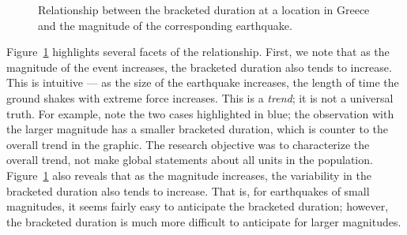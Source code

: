 \documentclass[
  letterpaper,
  DIV=11,
  numbers=noendperiod]{scrreprt}
\theoremstyle{definition}
\theoremstyle{definition}
\theoremstyle{plain}
\theoremstyle{remark}
\begin{document}
\begin{figure}


\caption{\label{fig-regsummaries-magnitude}Relationship between the
bracketed duration at a location in Greece and the magnitude of the
corresponding earthquake.}

\end{figure}%

Figure~\ref{fig-regsummaries-magnitude} highlights several facets of the
relationship. First, we note that as the magnitude of the event
increases, the bracketed duration also tends to increase. This is
intuitive --- as the size of the earthquake increases, the length of
time the ground shakes with extreme force increases. This is a
\emph{trend}; it is not a universal truth. For example, note the two
cases highlighted in blue; the observation with the larger magnitude has
a smaller bracketed duration, which is counter to the overall trend in
the graphic. The research objective was to characterize the overall
trend, not make global statements about all units in the population.
Figure~\ref{fig-regsummaries-magnitude} also reveals that as the
magnitude increases, the variability in the bracketed duration also
tends to increase. That is, for earthquakes of small magnitudes, it
seems fairly easy to anticipate the bracketed duration; however, the
bracketed duration is much more difficult to anticipate for larger
magnitudes.
\end{document}
